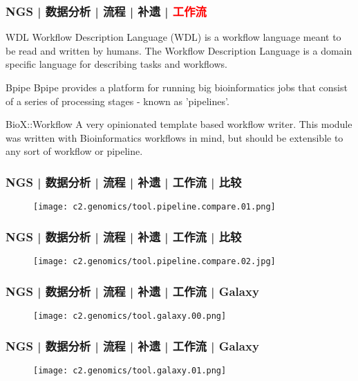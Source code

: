 \begin{frame}
  \frametitle{NGS | 数据分析 | 流程 | 补遗 | \textcolor{red}{工作流}}
  \begin{block}{WDL}
    Workflow Description Language (WDL) is a workflow language meant to be read and written by humans. The Workflow Description Language is a domain specific language for describing tasks and workflows.
  \end{block}
  \pause
  \begin{block}{Bpipe}
    Bpipe provides a platform for running big bioinformatics jobs that consist of a series of processing stages - known as 'pipelines'.
  \end{block}
  \pause
  \begin{block}{BioX::Workflow}
    A very opinionated template based workflow writer. This module was written with Bioinformatics workflows in mind, but should be extensible to any sort of workflow or pipeline.
  \end{block}
\end{frame}

\begin{frame}
  \frametitle{NGS | 数据分析 | 流程 | 补遗 | 工作流 | 比较}
  \begin{figure}
    \centering
    \texttt{[image: c2.genomics/tool.pipeline.compare.01.png]}
  \end{figure}
\end{frame}

\begin{frame}
  \frametitle{NGS | 数据分析 | 流程 | 补遗 | 工作流 | 比较}
  \begin{figure}
    \centering
    \texttt{[image: c2.genomics/tool.pipeline.compare.02.jpg]}
  \end{figure}
\end{frame}

\begin{frame}
  \frametitle{NGS | 数据分析 | 流程 | 补遗 | 工作流 | Galaxy}
  \begin{figure}
    \centering
    \texttt{[image: c2.genomics/tool.galaxy.00.png]}
  \end{figure}
\end{frame}

\begin{frame}
  \frametitle{NGS | 数据分析 | 流程 | 补遗 | 工作流 | Galaxy}
  \begin{figure}
    \centering
    \texttt{[image: c2.genomics/tool.galaxy.01.png]}
  \end{figure}
\end{frame}

